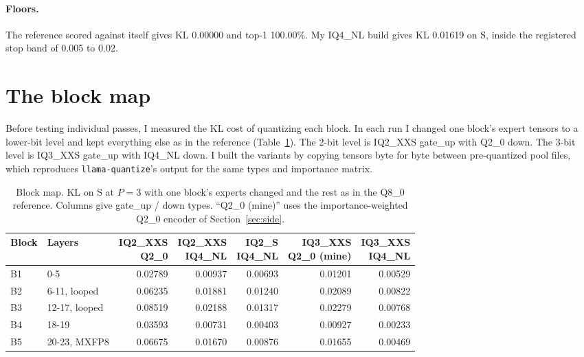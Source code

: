 \documentclass[11pt,a4paper]{article}
\newcommand{\code}[1]{\texttt{#1}}
\begin{document}
\paragraph{Floors.} The reference scored against itself gives KL 0.00000 and top-1 100.00\%. My IQ4\_NL build gives KL 0.01619 on S, inside the registered stop band of 0.005 to 0.02.

\section{The block map}

Before testing individual passes, I measured the KL cost of quantizing each block. In each run I changed one block's expert tensors to a lower-bit level and kept everything else as in the reference (Table~\ref{tab:map}). The 2-bit level is IQ2\_XXS gate\_up with Q2\_0 down. The 3-bit level is IQ3\_XXS gate\_up with IQ4\_NL down. I built the variants by copying tensors byte for byte between pre-quantized pool files, which reproduces \code{llama-quantize}'s output for the same types and importance matrix.

\begin{table}[t]
\centering\footnotesize
\caption{Block map. KL on S at $P = 3$ with one block's experts changed and the rest as in the Q8\_0 reference. Columns give gate\_up / down types. ``Q2\_0 (mine)'' uses the importance-weighted Q2\_0 encoder of Section~\ref{sec:side}.}
\label{tab:map}
\begin{tabular}{llrrrrr}
\toprule
Block & Layers & \shortstack{IQ2\_XXS\\Q2\_0} & \shortstack{IQ2\_XXS\\IQ4\_NL} & \shortstack{IQ2\_S\\IQ4\_NL} & \shortstack{IQ3\_XXS\\Q2\_0 (mine)} & \shortstack{IQ3\_XXS\\IQ4\_NL} \\
\midrule
B1 & 0-5 & 0.02789 & 0.00937 & 0.00693 & 0.01201 & 0.00529 \\
B2 & 6-11, looped & 0.06235 & 0.01881 & 0.01240 & 0.02089 & 0.00822 \\
B3 & 12-17, looped & 0.08519 & 0.02188 & 0.01317 & 0.02279 & 0.00768 \\
B4 & 18-19 & 0.03593 & 0.00731 & 0.00403 & 0.00927 & 0.00233 \\
B5 & 20-23, MXFP8 & 0.06675 & 0.01670 & 0.00876 & 0.01655 & 0.00469 \\
\bottomrule
\end{tabular}
\end{table}
\end{document}
